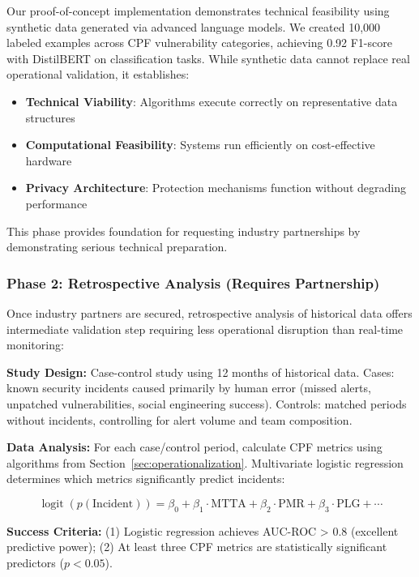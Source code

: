 \documentclass[11pt, a4paper]{article}
\DeclareMathOperator{\logit}{logit}
\begin{document}
Our proof-of-concept implementation\cite{canale2024slm} demonstrates technical feasibility using synthetic data generated via advanced language models. We created 10,000 labeled examples across CPF vulnerability categories, achieving 0.92 F1-score with DistilBERT on classification tasks. While synthetic data cannot replace real operational validation, it establishes:
\begin{itemize}
\item \textbf{Technical Viability}: Algorithms execute correctly on representative data structures
\item \textbf{Computational Feasibility}: Systems run efficiently on cost-effective hardware
\item \textbf{Privacy Architecture}: Protection mechanisms function without degrading performance
\end{itemize}

This phase provides foundation for requesting industry partnerships by demonstrating serious technical preparation.

\subsubsection{Phase 2: Retrospective Analysis (Requires Partnership)}

Once industry partners are secured, retrospective analysis of historical data offers intermediate validation step requiring less operational disruption than real-time monitoring:

\textbf{Study Design:} Case-control study using 12 months of historical data. Cases: known security incidents caused primarily by human error (missed alerts, unpatched vulnerabilities, social engineering success). Controls: matched periods without incidents, controlling for alert volume and team composition.

\textbf{Data Analysis:} For each case/control period, calculate CPF metrics using algorithms from Section~\ref{sec:operationalization}. Multivariate logistic regression determines which metrics significantly predict incidents:

\begin{equation}
\label{eq:logreg}
\logit(p(\text{Incident})) = \beta_0 + \beta_1 \cdot \text{MTTA} + \beta_2 \cdot \text{PMR} + \beta_3 \cdot \text{PLG} + \cdots
\end{equation}

\textbf{Success Criteria:} (1) Logistic regression achieves AUC-ROC > 0.8 (excellent predictive power); (2) At least three CPF metrics are statistically significant predictors ($p < 0.05$).
\end{document}
